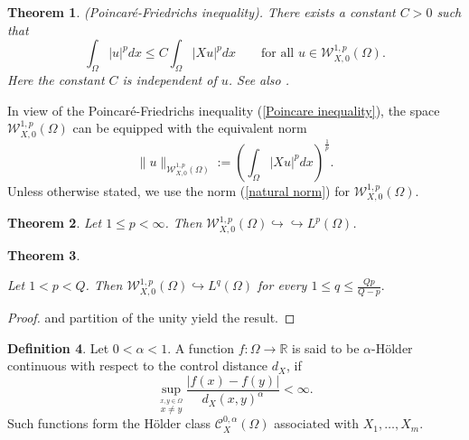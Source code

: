 \documentclass[a4paper,12pt,reqno]{amsart}
\renewcommand\eqref[1]{(\ref{#1})} %
\numberwithin{equation}{section}
\theoremstyle{plain}
\newtheorem{theorem}{Theorem}[section]
\theoremstyle{definition}
\newtheorem{definition}[theorem]{Definition}
\begin{document}
\begin{theorem}\cite[Theorem 2.5]{capogna2024asymptotic}  (Poincar\'e-Friedrichs inequality). There exists a  constant $C>0$ such that 
\begin{equation}\label{Poincare inequality}
\int_{\Omega}|u|^{p} d x\leq C \int_{\Omega}|X u|^{p} d x \qquad \text{for all }u\in \mathcal{W}_{X,0}^{1, p}(\Omega).
\end{equation}
Here the constant $C$ is independent of $u$. See also \cite[Proposition 2.6]{chen2024sharp}.
\end{theorem}
In view of the Poincar\'e-Friedrichs inequality \eqref{Poincare inequality}, the space $\mathcal{W}_{X,0}^{1, p}(\Omega)$ can be equipped with the equivalent norm
\begin{equation}\label{Poincare norm}
\|u\|_{\mathcal{W}_{X,0}^{1, p}(\Omega)}:=\left(\int_{\Omega}\left|X u\right|^{p} d x\right)^{\frac{1}{p}}.
\end{equation}
Unless otherwise stated, we use the norm \eqref{natural norm} for $\mathcal{W}_{X,0}^{1, p}(\Omega)$. 

\begin{theorem}\label{compact Sobolev embedding}\cite[Corollary 3.3]{Danielli1991}
Let $1\leq p<\infty$. Then  $\mathcal{W}_{X,0}^{1, p}(\Omega)\hookrightarrow\hookrightarrow L^{p}(\Omega)$.
\end{theorem}

\begin{theorem}\label{continuous Sobolev embedding for 1<p<Q}

Let  $1< p <Q$. Then  $\mathcal{W}_{X,0}^{1, p}(\Omega)\hookrightarrow L^{q}(\Omega)$   for every $1\leq q \leq \frac{Qp}{Q-p}.$  
\end{theorem}
\begin{proof}
\cite[Theorem 2.3]{capogna1993embedding} and partition of the unity yield the result. 
\end{proof}
\begin{definition}
Let $0<\alpha<1$. A function $f:\Omega\to \mathbb{R}$ is said to be $\alpha$-H\"older continuous with respect to the control distance $d_{X}$, if
\begin{equation*}
\sup_{\stackrel{x,y\in \Omega}{x\neq y}}\frac{|f(x)-f(y)|}{d_{X}(x,y)^{\alpha}}<\infty.   
\end{equation*}
Such functions form the H\"older class $\mathcal{C}^{0,\alpha}_{X}(\Omega)$ associated with $X_{1}, \ldots, X_{m}$.
\end{definition}
\end{document}
